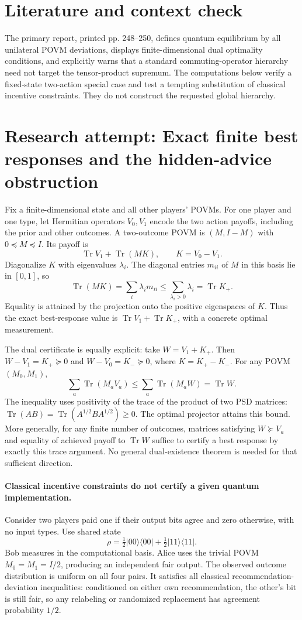 \documentclass[11pt]{article}
\begin{document}
\section{Literature and context check}
The primary report, printed pp. 248--250, defines quantum equilibrium by all unilateral POVM deviations, displays finite-dimensional dual optimality conditions, and explicitly warns that a standard commuting-operator hierarchy need not target the tensor-product supremum. The computations below verify a fixed-state two-action special case and test a tempting substitution of classical incentive constraints. They do not construct the requested global hierarchy.
\section{Research attempt: Exact finite best responses and the hidden-advice obstruction}

Fix a finite-dimensional state and all other players' POVMs. For one player and one type, let Hermitian operators $V_0,V_1$ encode the two action payoffs, including the prior and other outcomes. A two-outcome POVM is $(M,I-M)$ with $0\preceq M\preceq I$. Its payoff is
\[
\operatorname{Tr}V_1+\operatorname{Tr}(M K),\qquad K=V_0-V_1.
\]
Diagonalize $K$ with eigenvalues $\lambda_i$. The diagonal entries $m_{ii}$ of $M$ in this basis lie in $[0,1]$, so
\[
\operatorname{Tr}(MK)=\sum_i\lambda_i m_{ii}\leq\sum_{\lambda_i>0}\lambda_i
=\operatorname{Tr}K_+.
\]
Equality is attained by the projection onto the positive eigenspaces of $K$. Thus the exact best-response value is $\operatorname{Tr}V_1+\operatorname{Tr}K_+$, with a concrete optimal measurement.

The dual certificate is equally explicit: take $W=V_1+K_+$. Then $W-V_1=K_+\succeq0$ and $W-V_0=K_-\succeq0$, where $K=K_+-K_-$. For any POVM $(M_0,M_1)$,
\[
\sum_a\operatorname{Tr}(M_aV_a)\leq\sum_a\operatorname{Tr}(M_aW)=\operatorname{Tr}W.
\]
The inequality uses positivity of the trace of the product of two PSD matrices: $\operatorname{Tr}(AB)=\operatorname{Tr}(A^{1/2}BA^{1/2})\geq0$. The optimal projector attains this bound. More generally, for any finite number of outcomes, matrices satisfying $W\succeq V_a$ and equality of achieved payoff to $\operatorname{Tr}W$ suffice to certify a best response by exactly this trace argument. No general dual-existence theorem is needed for that sufficient direction.

\paragraph{Classical incentive constraints do not certify a given quantum implementation.}
Consider two players paid one if their output bits agree and zero otherwise, with no input types. Use shared state
\[
\rho=\tfrac12|00\rangle\langle00|+\tfrac12|11\rangle\langle11|.
\]
Bob measures in the computational basis. Alice uses the trivial POVM $M_0=M_1=I/2$, producing an independent fair output. The observed outcome distribution is uniform on all four pairs. It satisfies all classical recommendation-deviation inequalities: conditioned on either own recommendation, the other's bit is still fair, so any relabeling or randomized replacement has agreement probability $1/2$.
\end{document}
